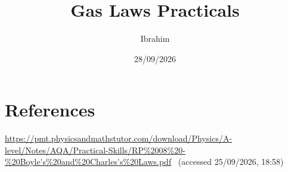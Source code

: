 \documentclass[11pt,a4paper]{article}
\title{Gas Laws Practicals}
\author{Ibrahim}
\date{28/09/2026}
\begin{document}
\maketitle

\clearpage

\clearpage
\section*{References}
\noindent
\url{https://pmt.physicsandmathstutor.com/download/Physics/A-level/Notes/AQA/Practical-Skills/RP%2008%20-%20Boyle's%20and%20Charles's%20Laws.pdf}
\ (accessed 25/09/2026, 18:58)
\end{document}
